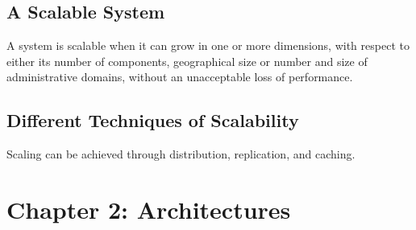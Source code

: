 \documentclass[11pt,a4paper]{report}
\begin{document}
	\section{A Scalable System}
	A system is scalable when it can grow in one or more dimensions, with respect to either its number of components, geographical size or number and size of administrative domains, without an unacceptable loss of performance.
	
	\section{Different Techniques of Scalability}
	Scaling can be achieved through distribution, replication, and caching.
	
	\chapter{Chapter 2: Architectures}
	\newpage
  	
\end{document}
